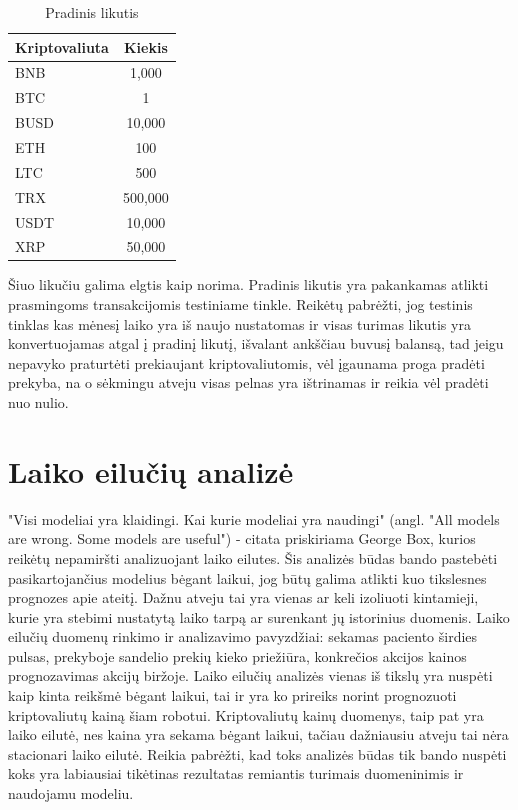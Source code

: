 \documentclass{VUMIFInfKursinis}
\begin{document}
\begin{table}[H]\footnotesize
  \centering
  \caption{Pradinis likutis}    %
  {\begin{tabular}{|l|c|} \hline
      Kriptovaliuta & Kiekis  \\
      \hline
      BNB           & 1,000   \\
      BTC           & 1       \\
      BUSD          & 10,000  \\
      ETH           & 100     \\
      LTC           & 500     \\
      TRX           & 500,000 \\
      USDT          & 10,000  \\
      XRP           & 50,000  \\
      \hline 
    \end{tabular}}
\end{table}

Šiuo likučiu galima elgtis kaip norima. Pradinis likutis yra pakankamas atlikti prasmingoms transakcijomis testiniame tinkle. Reikėtų pabrėžti, jog testinis
tinklas kas mėnesį laiko yra iš naujo nustatomas ir visas turimas likutis yra konvertuojamas atgal į pradinį likutį, išvalant ankščiau buvusį balansą, tad jeigu
nepavyko praturtėti prekiaujant kriptovaliutomis, vėl įgaunama proga pradėti prekyba, na o sėkmingu atveju visas pelnas yra ištrinamas ir reikia vėl pradėti
nuo nulio.

\section{Laiko eilučių analizė}
"Visi modeliai yra klaidingi. Kai kurie modeliai yra naudingi" (angl. "All models are wrong. Some models are useful") - citata priskiriama George Box, kurios
reikėtų nepamiršti analizuojant laiko eilutes. Šis analizės būdas bando pastebėti pasikartojančius modelius bėgant laikui, jog būtų galima atlikti kuo tikslesnes
prognozes apie ateitį. 
Dažnu atveju tai yra vienas ar keli izoliuoti kintamieji, kurie yra stebimi nustatytą laiko tarpą ar surenkant jų istorinius duomenis. Laiko eilučių duomenų 
rinkimo ir analizavimo pavyzdžiai: sekamas paciento širdies pulsas, prekyboje sandelio prekių kieko priežiūra, konkrečios akcijos kainos prognozavimas akcijų biržoje. 
Laiko eilučių analizės vienas iš tikslų yra nuspėti kaip kinta reikšmė bėgant laikui, tai ir yra ko prireiks norint prognozuoti kriptovaliutų kainą šiam robotui. 
Kriptovaliutų kainų duomenys, taip pat yra laiko eilutė, nes kaina yra sekama bėgant laikui, tačiau dažniausiu atveju tai nėra stacionari laiko eilutė.
Reikia pabrėžti, kad toks analizės būdas tik bando nuspėti koks yra labiausiai tikėtinas rezultatas remiantis turimais duomeninimis ir naudojamu modeliu. 
\end{document}

